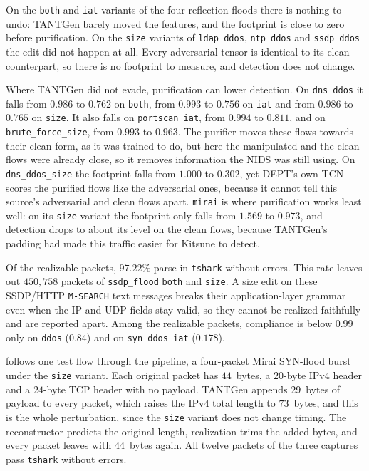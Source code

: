 On the \texttt{both} and \texttt{iat} variants of the four reflection floods there is
nothing to undo: TANTGen barely moved the features, and the footprint is close to zero
before purification. On the \texttt{size} variants of \texttt{ldap\_ddos},
\texttt{ntp\_ddos} and \texttt{ssdp\_ddos} the edit did not happen at all. Every
adversarial tensor is identical to its clean counterpart, so there is no footprint to
measure, and detection does not change.

Where TANTGen did not evade, purification can lower detection. On \texttt{dns\_ddos} it
falls from $0.986$ to $0.762$ on \texttt{both}, from $0.993$ to $0.756$ on \texttt{iat}
and from $0.986$ to $0.765$ on \texttt{size}. It also falls on \texttt{portscan\_iat},
from $0.994$ to $0.811$, and on \texttt{brute\_force\_size}, from $0.993$ to $0.963$. The
purifier moves these flows towards their clean form, as it was trained to do, but here
the manipulated and the clean flows were already close, so it removes information the
\ac{NIDS} was still using. On \texttt{dns\_ddos\_size} the footprint falls from $1.000$
to $0.302$, yet DEPT's own \ac{TCN} scores the purified flows like the adversarial ones,
because it cannot tell this source's adversarial and clean flows apart.
\texttt{mirai} is where purification works least well: on its \texttt{size} variant
the footprint only falls from $1.569$ to $0.973$, and detection
drops to about its level on the clean flows, because TANTGen's padding had made this
traffic easier for Kitsune to detect.

Of the realizable packets, $97.22\%$ parse in \texttt{tshark} without errors. This rate
leaves out $450{,}758$ packets of \texttt{ssdp\_flood} \texttt{both} and \texttt{size}. A
size edit on these SSDP/HTTP \texttt{M-SEARCH} text messages breaks their
application-layer grammar even when the IP and UDP fields stay valid, so they cannot be
realized faithfully and are reported apart. Among the realizable packets, compliance
is below $0.99$ only on \texttt{ddos} ($0.84$) and on \texttt{syn\_ddos\_iat}
($0.178$).

 follows one test flow through the pipeline, a four-packet
Mirai SYN-flood burst under the \texttt{size} variant. Each original packet has
$44$~bytes, a $20$-byte IPv4 header and a $24$-byte TCP header with no payload. TANTGen
appends $29$~bytes of payload to every packet, which raises the IPv4 total length to
$73$~bytes, and this is the whole perturbation, since the \texttt{size} variant does not
change timing. The reconstructor predicts the original length, realization trims the
added bytes, and every packet leaves with $44$~bytes again. All twelve packets of the
three captures pass \texttt{tshark} without errors.

